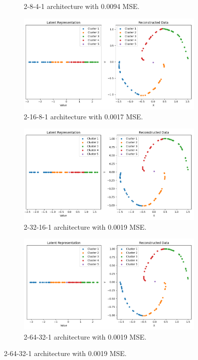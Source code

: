 \begin{figure}[htb]
\begin{subfigure}[b]{0.49\textwidth}
    \caption{2-8-4-1 architecture with 0.0094 MSE.}
    \label{fig:2-8-4-1}
  \end{subfigure}
  \hfill
  \begin{subfigure}[b]{0.49\textwidth}
    \centering
    \includegraphics[width=\linewidth]{images/RQ1/2-16-8-1_0.0017.png}
    \caption{2-16-8-1 architecture with \textcolor{green!80!black}{0.0017} MSE.}
    \label{fig:2-16-8-1}
  \end{subfigure}
  \hfill
  \begin{subfigure}[b]{0.49\textwidth}
    \centering
    \includegraphics[width=\linewidth]{images/RQ1/2-32-16-1_0.0019.png}
    \caption{2-32-16-1 architecture with \textcolor{green!60!black}{0.0019} MSE.}
    \label{fig:2-32-16-1}
  \end{subfigure}
  \hfill
  \begin{subfigure}[b]{0.49\textwidth}
    \centering
    \includegraphics[width=\linewidth]{images/RQ1/2-64-32-1_0.0019.png}
    \caption{2-64-32-1 architecture with \textcolor{green!60!black}{0.0019} MSE.}
    \label{fig:2-64-32-1}
  \end{subfigure}


\end{figure}
